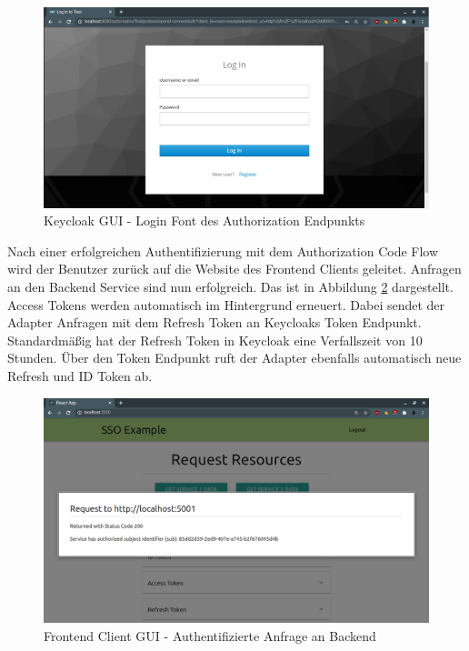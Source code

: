 \begin{figure}[!ht]
	\centering
	\includegraphics[width=1\textwidth]{Images/Ebert/FrontendLoginForm.PNG}
	\caption{Keycloak GUI - Login Font des Authorization Endpunkts}
	\label{fig:EB_Login Font des Authorization Endpunkts}
\end{figure}

Nach einer erfolgreichen Authentifizierung mit dem Authorization Code Flow wird der Benutzer zurück auf die Website des Frontend Clients geleitet. Anfragen an den Backend Service sind nun erfolgreich. Das ist in Abbildung \ref{fig:EB_Authentifizierte Anfrage an Backend} dargestellt. Access Tokens werden automatisch im Hintergrund erneuert. Dabei sendet der Adapter Anfragen mit dem Refresh Token an Keycloaks Token Endpunkt. Standardmäßig hat der Refresh Token in Keycloak eine Verfallszeit von 10 Stunden. Über den Token Endpunkt ruft der Adapter ebenfalls automatisch neue Refresh und ID Token ab.

\begin{figure}[!ht]
	\centering
	\includegraphics[width=1\textwidth]{Images/Ebert/FrontendLoggedInBackendRequest.PNG}
	\caption{Frontend Client GUI - Authentifizierte Anfrage an Backend}
	\label{fig:EB_Authentifizierte Anfrage an Backend}
\end{figure} 

